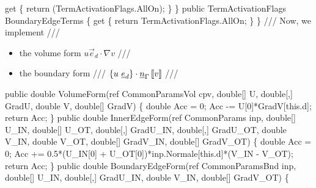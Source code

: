 {\btab \btab get \{ return (TermActivationFlags.AllOn); \} \newline 
\btab \} \newline 
 \newline 
\btab public TermActivationFlags BoundaryEdgeTerms \{ \newline 
\btab    get \{ return TermActivationFlags.AllOn; \} \newline 
\btab \} \newline 
 \newline 
    /// Now, we implement 
    /// \begin{itemize}
    ///    \item the volume form $u \vec{e}_d \cdot \nabla v$
    ///    \item the boundary form 
    ///       $\mean{u \ \vec{e}_d} \cdot \vec{n}_\Gamma \jump{v}$
    /// \end{itemize}
\btab public double VolumeForm(ref CommonParamsVol cpv,  \newline 
\btab \btab    double[] U, double[,] GradU,  \newline 
\btab \btab    double V, double[] GradV) \{ \newline 
 \newline 
\btab \btab double Acc = 0; \newline 
\btab \btab Acc -= U[0]*GradV[this.d]; \newline 
\btab \btab return Acc; \newline 
\btab \}         \newline 
 \newline 
\btab public double InnerEdgeForm(ref CommonParams inp,  \newline 
\btab \btab double[] U\_IN, double[] U\_OT, double[,] GradU\_IN, double[,] GradU\_OT,  \newline 
\btab \btab double V\_IN, double V\_OT, double[] GradV\_IN, double[] GradV\_OT) \{ \newline 
 \newline 
\btab \btab double Acc = 0; \newline 
\btab \btab Acc += 0.5*(U\_IN[0] + U\_OT[0])*inp.Normale[this.d]*(V\_IN - V\_OT); \newline 
\btab \btab return Acc;   \newline 
\btab  \} \newline 
 \newline 
\btab public double BoundaryEdgeForm(ref CommonParamsBnd inp,  \newline 
\btab \btab double[] U\_IN, double[,] GradU\_IN, double V\_IN, double[] GradV\_OT) \{ \newline 
}
